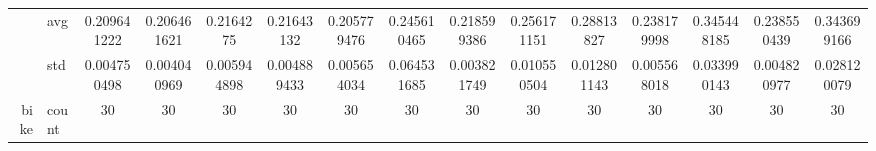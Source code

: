 \begin{table}[htbp]
{\begin{tabular}{rlccc|c|c|c|c|c|ccccc}
			                                                                               & avg                & \cellcolor[rgb]{ .459,  .765,  .486}0.209641222                                & \cellcolor[rgb]{ .4,  .745,  .482}0.206461621                                  & \cellcolor[rgb]{ .588,  .8,  .49}0.2164275                                     & \cellcolor[rgb]{ .588,  .8,  .49}0.21643132     & \cellcolor[rgb]{ .388,  .745,  .482}\textcolor[rgb]{ 0,  .38,  0}{0.205779476} & \cellcolor[rgb]{ 1,  .886,  .514}0.245610465    & \cellcolor[rgb]{ .627,  .812,  .494}0.218599386                                & \cellcolor[rgb]{ .996,  .839,  .502}0.256171151 & \cellcolor[rgb]{ .988,  .686,  .475}0.28813827  & \cellcolor[rgb]{ 1,  .922,  .518}0.238179998    & \cellcolor[rgb]{ .973,  .412,  .42}0.345448185  & \cellcolor[rgb]{ 1,  .922,  .518}0.238550439    & \cellcolor[rgb]{ .976,  .424,  .424}0.343699166 \\
			                                                                               & std                & 0.004750498                                                                    & 0.004040969                                                                    & 0.005944898                                                                    & 0.004889433                                     & 0.005654034                                                                    & 0.064531685                                     & 0.003821749                                                                    & 0.010550504                                     & 0.012801143                                     & 0.005568018                                     & 0.033990143                                     & 0.004820977                                     & 0.028120079                                     \\
			bike                                                                           & count              & 30                                                                             & 30                                                                             & 30                                                                             & 30                                              & 30                                                                             & 30                                              & 30                                                                             & 30                                              & 30                                              & 30                                              & 30                                              & 30                                              & 30                                              \\

\end{tabular}}
\end{table}
